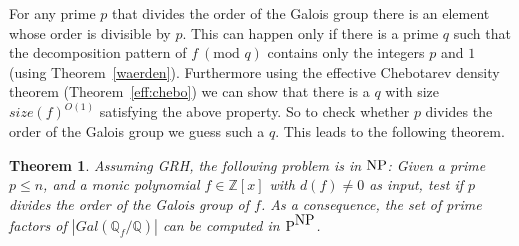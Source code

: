 \documentclass{article}
\newtheorem{theorem}{Theorem}[section]
\newtheorem{lemma}[theorem]{Lemma}
\newcommand{\Gal}[1]{\ensuremath{Gal\left(#1\right)}}
\newcommand{\Q}[0]{\ensuremath{\mathbb{Q}}}
\newcommand{\Z}[0]{\ensuremath{\mathbb{Z}}}
\newcommand{\F}[0]{\ensuremath{\mathbb{F}}}
\renewcommand{\angle}[1]{\langle #1\rangle}
\newcommand{\NP}{\mbox{\rm NP}}
\newcommand{\p}{\mbox{\rm P}}
\begin{document}
For any prime $p$ that divides the order of the Galois group there is
an element whose order is divisible by $p$. This can happen only if
there is a prime $q$ such that the decomposition pattern of $f\ 
(\textrm{mod } q)$ contains only the integers $p$ and $1$ (using
Theorem~\ref{waerden}). Furthermore using the effective Chebotarev
density theorem (Theorem~\ref{eff:chebo}) we can show that there is a
$q$ with size $size(f)^{O(1)}$ satisfying the above property. So to
check whether $p$ divides the order of the Galois group we guess such
a $q$. This leads to the following theorem.
%
%

\begin{theorem}\label{primes-np}
  Assuming GRH, the following problem is in $\NP$: Given a prime
  $p\leq n$, and a monic polynomial $f\in\Z[x]$ with $d(f)\neq 0$ as
  input, test if $p$ divides the order of the Galois group of $f$. As
  a consequence, the set of prime factors of $|\Gal{\Q_f/\Q}|$ can be
  computed in $\p^{\NP}$.
\end{theorem}

%  
\end{document}
